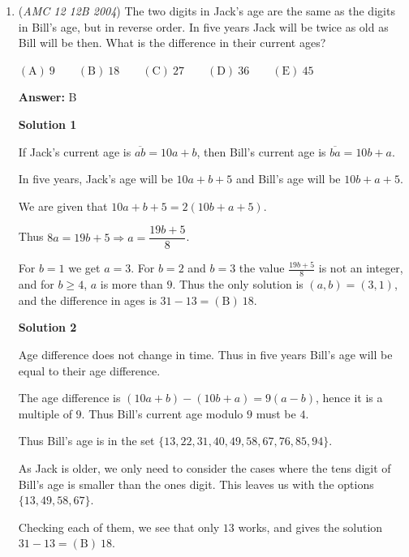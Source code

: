 \begin{enumerate}
 This would be much easier to show and more convincing with a diagram but idk how to upload GeoGebra to AoPSwiki.

 Solution by franzliszt

 


	\item (\textit{AMC 12 12B 2004}) The two digits in Jack's age are the same as the digits in Bill's age, but in reverse order. In five years Jack will be twice as old as Bill will be then. What is the difference in their current ages?


 $\mathrm{(A) \ } 9 \qquad \mathrm{(B) \ } 18 \qquad \mathrm{(C) \ } 27 \qquad \mathrm{(D) \ } 36\qquad \mathrm{(E) \ } 45$

 \textbf{Answer: }B



\textbf{Solution 1}

If Jack's current age is $\overline{ab}=10a+b$, then Bill's current age is $\overline{ba}=10b+a$.

 In five years, Jack's age will be $10a+b+5$ and Bill's age will be $10b+a+5$. 

 We are given that $10a+b+5=2(10b+a+5)$. 

 
Thus $8a=19b+5 \Rightarrow a=\dfrac{19b+5}{8}$. 

 For $b=1$ we get $a=3$. For $b=2$ and $b=3$ the value $\frac{19b+5}8$ is not an integer, and for $b\geq 4$, $a$ is more than $9$. Thus the only solution is $(a,b)=(3,1)$, and the difference in ages is $31-13=\boxed{\mathrm{(B)\ }18}$.

 



\textbf{Solution 2}

Age difference does not change in time. Thus in five years Bill's age will be equal to their age difference.

 The age difference is $(10a+b)-(10b+a)=9(a-b)$, hence it is a multiple of $9$. Thus Bill's current age modulo $9$ must be $4$.

 Thus Bill's age is in the set $\{13,22,31,40,49,58,67,76,85,94\}$.

 As Jack is older, we only need to consider the cases where the tens digit of Bill's age is smaller than the ones digit. This leaves us with the options $\{13,49,58,67\}$. 

 Checking each of them, we see that only $13$ works, and gives the solution $31-13=\boxed{\mathrm{(B)\ }18}$.

 



\end{enumerate}
